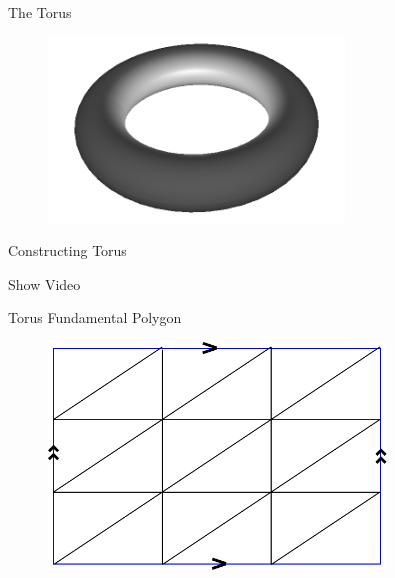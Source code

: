 \documentclass{beamer}
\begin{document}
\begin{frame}{The Torus}

\begin{figure}[t]
    \includegraphics[width=0.7\textwidth]{TorusFull.png}
\end{figure}

\end{frame}


\begin{frame}{Constructing Torus}

Show Video

\end{frame}

\begin{frame}{Torus Fundamental Polygon}


\begin{figure}[t]
    \includegraphics[width=0.8\textwidth]{FundamentalPolygon.pdf}
\end{figure}

\end{frame}
\end{document}
